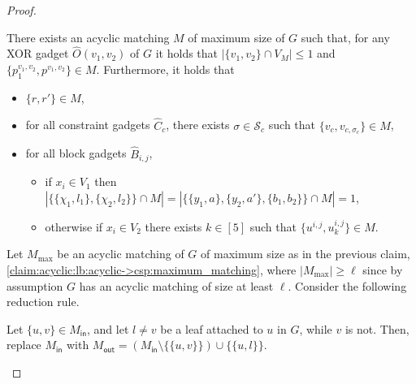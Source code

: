 \begin{proof}
\begin{nestedproof}
            \begin{claim}\label{claim:acyclic:lb:acyclic->csp:matching_properties}
                There exists an acyclic matching $M$ of maximum size of $G$ such that,
                for any XOR gadget $\hat{O}(v_1,v_2)$ of $G$ it holds that $|\{v_1,v_2\} \cap V_M| \le 1$ and $\{p^{v_1,v_2}_1,p^{v_1,v_2}\} \in M$.
                Furthermore, it holds that
                \begin{itemize}
                    \item $\{r,r'\} \in M$,

                    \item for all constraint gadgets $\hat{C}_c$,
                    there exists $\sigma \in \mathcal{S}_c$ such that $\{v_c, v_{c,\sigma_c}\} \in M$,

                    \item for all block gadgets $\hat{B}_{i,j}$,
                    \begin{itemize}
                        \item if $x_i \in V_1$ then
                        $| \{ \{\chi_1,l_1\}, \{\chi_2,l_2\} \} \cap M| =
                        |\{\{ y_1, a \}, \{ y_2, a' \}, \{ b_1, b_2 \}\} \cap M| = 1$,

                        \item otherwise if $x_i \in V_2$ there exists $k \in [5]$ such that $\{u^{i,j}, u^{i,j}_k\} \in M$.
                    \end{itemize}
                \end{itemize}
            \end{claim}

            \begin{claimproof}
                Let $M_{\max}$ be an acyclic matching of $G$ of maximum size as in
                \iflncs
                the previous claim,
                \else
                \cref{claim:acyclic:lb:acyclic->csp:maximum_matching},
                \fi
                where $|M_{\max}| \ge \ell$ since by assumption $G$ has an acyclic matching of size at least $\ell$.
                Consider the following reduction rule.

                Let $\{u,v\} \in M_{\mathsf{in}}$, and let $l \neq v$ be a leaf attached to $u$ in $G$, while $v$ is not.
                Then, replace $M_{\mathsf{in}}$ with $M_{\mathsf{out}} = (M_{\mathsf{in}} \setminus \{\{u,v\}\}) \cup \{\{u,l\}\}$.


\end{claimproof}
\end{nestedproof}
\end{proof}
